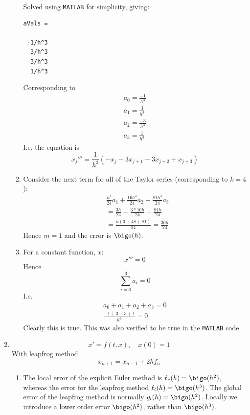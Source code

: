 \documentclass{X:/Documents/Coding/Latex/myassignment}
\begin{document}
\begin{enumerate}
\begin{enumerate}
		Solved using \verb|MATLAB| for simplicity, giving:
		\begin{verbatim}
aVals =
 
 -1/h^3
  3/h^3
 -3/h^3
  1/h^3
		\end{verbatim}
		
		Corresponding to 
		\begin{align*}
			a_0 = \frac{-1}{h^3}\\
			a_1 = \frac{3}{h^3}\\
			a_2 = \frac{-3}{h^3}\\
			a_3 = \frac{1}{h^3}
		\end{align*}
		I.e. the equation is
		\[x_j''' = \frac1{h^3}\left(-x_j + 3x_{j+1} - 3x_{j+2} + x_{j+3}\right)\]
		\item %
		Consider the next term for all of the Taylor series (corresponding to $k=4$):
		\begin{align*}
			&\frac{h^4}{24}a_1 + \frac{16h^4}{24} a_2 + \frac{81h^4}{24}a_3\\
			&=\frac{3h}{24} - \frac{3*16h}{24} + \frac{81h}{24}\\
			&=\frac{h(3-48 + 81)}{24} = \frac{36h}{24} 
		\end{align*}
		Hence $m = 1$ and the error is $\bigo(h)$.

		\item %
		For a constant function, $x$: 
		\[x''' = 0\]
		Hence
		\[\sum_{i=0}^3 a_i = 0\]
		I.e.
		\begin{align*}
			a_0 + a_1 + a_2 + a_3 = 0\\
			\frac{-1+3-3+1}{h^3} = 0
		\end{align*}
		Clearly this is true.
		This was also verified to be true in the \verb|MATLAB| code.
		
	\end{enumerate}
	\item 
	\[x' = f(t,x),\quad x(0) = 1\]
	With leapfrog method
	\[x_{n+1} = x_{n-1} + 2h f_n\]
	\begin{enumerate}
		\item %
		The local error of the explicit Euler method is $\ell_e(h) =\bigo(h^2)$, whereas the error for the leapfrog method $\ell_l(h)=\bigo(h^3)$. The global error of the leapfrog method is normally $g_l(h) = \bigo(h^2)$. 
		Locally we introduce a lower order error $\bigo(h^2)$, rather than $\bigo(h^3)$.


\end{enumerate}
\end{enumerate}
\end{document}
